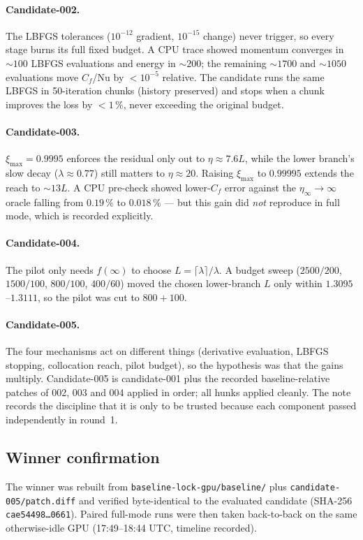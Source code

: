 \documentclass[11pt,a4paper]{article}
\newcommand{\code}[1]{\texttt{\small #1}}
\newcommand{\pct}{\,\%}
\begin{document}
\paragraph{Candidate-002.} The LBFGS tolerances ($10^{-12}$ gradient, $10^{-15}$ change)
never trigger, so every stage burns its full fixed budget. A CPU trace showed momentum
converges in ${\sim}100$ LBFGS evaluations and energy in ${\sim}200$; the remaining
${\sim}1700$ and ${\sim}1050$ evaluations move $C_f$/$\mathrm{Nu}$ by $<10^{-5}$ relative.
The candidate runs the same LBFGS in 50-iteration chunks (history preserved) and stops when
a chunk improves the loss by $<1\pct$, never exceeding the original budget.

\paragraph{Candidate-003.} $\xi_{\max}=0.9995$ enforces the residual only out to
$\eta \approx 7.6L$, while the lower branch's slow decay ($\lambda\approx0.77$) still
matters to $\eta\approx20$. Raising $\xi_{\max}$ to $0.99995$ extends the reach to
${\sim}13L$. A CPU pre-check showed lower-$C_f$ error against the $\eta_\infty\to\infty$
oracle falling from $0.19\pct$ to $0.018\pct$ --- but this gain did \emph{not} reproduce in
full mode, which is recorded explicitly.

\paragraph{Candidate-004.} The pilot only needs $f(\infty)$ to choose
$L=\lceil\lambda\rceil/\lambda$. A budget sweep ($2500/200$, $1500/100$, $800/100$,
$400/60$) moved the chosen lower-branch $L$ only within $1.3095$--$1.3111$, so the pilot was
cut to $800+100$.

\paragraph{Candidate-005.} The four mechanisms act on different things (derivative
evaluation, LBFGS stopping, collocation reach, pilot budget), so the hypothesis was that the
gains multiply. Candidate-005 is candidate-001 plus the recorded baseline-relative patches
of 002, 003 and 004 applied in order; all hunks applied cleanly. The note records the
discipline that it is only to be trusted because each component passed independently in
round~1.

\subsection{Winner confirmation}
The winner was rebuilt from \code{baseline-lock-gpu/baseline/} plus
\code{candidate-005/patch.diff} and verified byte-identical to the evaluated candidate
(SHA-256 \code{cae54498\ldots 0661}). Paired full-mode runs were then taken back-to-back on
the same otherwise-idle GPU (17:49--18:44 UTC, timeline recorded).
\end{document}
